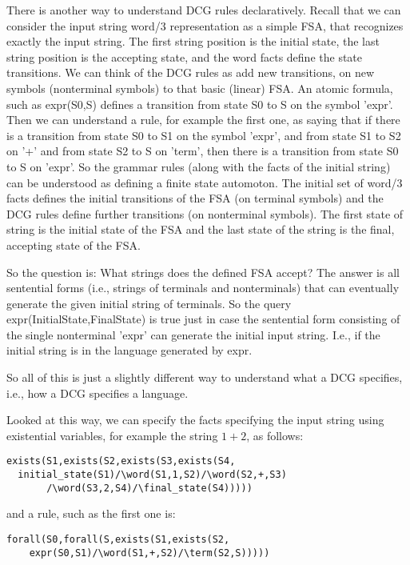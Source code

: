 There is another way to understand DCG rules declaratively.  Recall
that we can consider the input string word/3 representation as a
simple FSA, that recognizes exactly the input string.  The first
string position is the initial state, the last string position is the
accepting state, and the word facts define the state transitions.  We
can think of the DCG rules as add new transitions, on new symbols
(nonterminal symbols) to that basic (linear) FSA.  An atomic formula,
such as expr(S0,S) defines a transition from state S0 to S on the
symbol 'expr'.  Then we can understand a rule, for example the first
one, as saying that if there is a transition from state S0 to S1 on
the symbol 'expr', and from state S1 to S2 on '+' and from state S2 to
S on 'term', then there is a transition from state S0 to S on 'expr'.
So the grammar rules (along with the facts of the initial string) can
be understood as defining a finite state automoton.  The initial set
of word/3 facts defines the initial transitions of the FSA (on
terminal symbols) and the DCG rules define further transitions (on
nonterminal symbols).  The first state of string is the initial state
of the FSA and the last state of the string is the final, accepting
state of the FSA.

So the question is: What strings does the defined FSA accept?  The
answer is all sentential forms (i.e., strings of terminals and
nonterminals) that can eventually generate the given initial string of
terminals.  So the query expr(InitialState,FinalState) is true just in
case the sentential form consisting of the single nonterminal 'expr'
can generate the initial input string.  I.e., if the initial string is
in the language generated by expr.

So all of this is just a slightly different way to understand what a
DCG specifies, i.e., how a DCG specifies a language.

Looked at this way, we can specify the facts specifying the input
string using existential variables, for example the string $1+2$, as
follows:
\begin{verbatim}
exists(S1,exists(S2,exists(S3,exists(S4,
  initial_state(S1)/\word(S1,1,S2)/\word(S2,+,S3)
       /\word(S3,2,S4)/\final_state(S4)))))
\end{verbatim}
and a rule, such as the first one is:
\begin{verbatim}
forall(S0,forall(S,exists(S1,exists(S2,
    expr(S0,S1)/\word(S1,+,S2)/\term(S2,S)))))
\end{verbatim}

